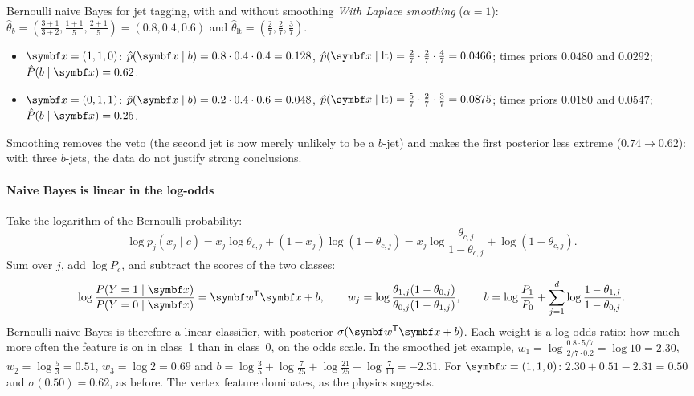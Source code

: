 \documentclass[11pt]{article}
\newcommand{\w}{\vect{w}}
\begin{document}
\begin{worked}{Bernoulli naive Bayes for jet tagging, with and without smoothing}
\emph{With Laplace smoothing} ($\alpha = 1$): $\hat\theta_b = (\tfrac{3+1}{3+2}, \tfrac{1+1}{5}, \tfrac{2+1}{5}) = (0.8, 0.4, 0.6)$
and $\hat\theta_{\mathrm{lt}} = (\tfrac27, \tfrac27, \tfrac37)$.
\begin{itemize}
\item $\x = (1, 1, 0)$: $\hat p(\x \mid b) = 0.8 \cdot 0.4 \cdot 0.4 = 0.128$, $\hat p(\x \mid \mathrm{lt}) = \tfrac27 \cdot \tfrac27 \cdot \tfrac47 = 0.0466$;
times priors $0.0480$ and $0.0292$; $\hat P(b \mid \x) = 0.62$.
\item $\x = (0, 1, 1)$: $\hat p(\x \mid b) = 0.2 \cdot 0.4 \cdot 0.6 = 0.048$, $\hat p(\x \mid \mathrm{lt}) = \tfrac57 \cdot \tfrac27 \cdot \tfrac37 = 0.0875$;
times priors $0.0180$ and $0.0547$; $\hat P(b \mid \x) = 0.25$.
\end{itemize}
Smoothing removes the veto (the second jet is now merely unlikely to be a $b$-jet) and makes the first posterior less
extreme ($0.74 \to 0.62$): with three $b$-jets, the data do not justify strong conclusions.
\end{worked}

\paragraph{Naive Bayes is linear in the log-odds} Take the logarithm of the Bernoulli probability:
\[
  \log p_j(x_j \mid c) = x_j \log\theta_{c,j} + (1 - x_j)\log(1 - \theta_{c,j})
  = x_j \log\frac{\theta_{c,j}}{1 - \theta_{c,j}} + \log(1 - \theta_{c,j}) .
\]
Sum over $j$, add $\log P_c$, and subtract the scores of the two classes:
\begin{equation}\label{eq:nblinear}
  \log\frac{P(Y = 1 \mid \x)}{P(Y = 0 \mid \x)} = \w\T\x + b, \qquad
  w_j = \log\frac{\theta_{1,j}(1 - \theta_{0,j})}{\theta_{0,j}(1 - \theta_{1,j})}, \qquad
  b = \log\frac{P_1}{P_0} + \sum_{j=1}^d \log\frac{1 - \theta_{1,j}}{1 - \theta_{0,j}} .
\end{equation}
Bernoulli naive Bayes is therefore a linear classifier, with posterior $\sigma(\w\T\x + b)$. Each weight is a log
odds ratio: how much more often the feature is on in class~1 than in class~0, on the odds scale. In the smoothed jet
example, $w_1 = \log\frac{0.8 \cdot 5/7}{2/7 \cdot 0.2} = \log 10 = 2.30$, $w_2 = \log\tfrac53 = 0.51$,
$w_3 = \log 2 = 0.69$ and $b = \log\tfrac35 + \log\tfrac{7}{25} + \log\tfrac{21}{25} + \log\tfrac{7}{10} = -2.31$. For
$\x = (1, 1, 0)$: $2.30 + 0.51 - 2.31 = 0.50$ and $\sigma(0.50) = 0.62$, as before. The vertex feature dominates, as
the physics suggests.
\end{document}
